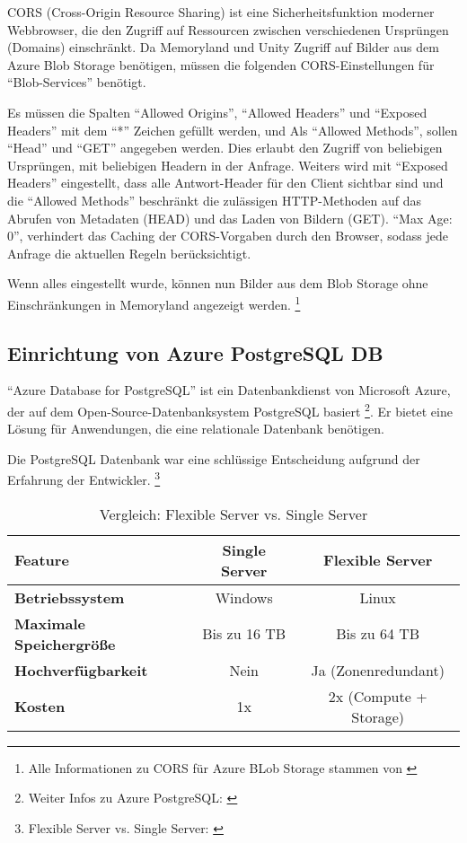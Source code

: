 CORS (Cross-Origin Resource Sharing) ist eine Sicherheitsfunktion moderner Webbrowser, 
die den Zugriff auf Ressourcen zwischen verschiedenen Ursprüngen (Domains) einschränkt.
Da Memoryland und Unity Zugriff auf Bilder aus dem Azure Blob Storage benötigen, müssen
die folgenden CORS-Einstellungen für ``Blob-Services'' benötigt.

Es müssen die Spalten ``Allowed Origins'', ``Allowed Headers'' und ``Exposed Headers''
mit dem ``*'' Zeichen gefüllt werden, und Als ``Allowed Methods'', sollen ``Head'' und
``GET'' angegeben werden. Dies erlaubt den Zugriff von beliebigen Ursprüngen, mit beliebigen
Headern in der Anfrage. Weiters wird mit ``Exposed Headers'' eingestellt, dass alle 
Antwort-Header für den Client sichtbar sind und die ``Allowed Methods'' beschränkt die 
zulässigen HTTP-Methoden auf das Abrufen von Metadaten (HEAD) und das 
Laden von Bildern (GET). ``Max Age: 0'', verhindert das Caching der CORS-Vorgaben 
durch den Browser, sodass jede Anfrage die aktuellen Regeln berücksichtigt.

Wenn alles eingestellt wurde, können nun Bilder aus dem Blob Storage ohne Einschränkungen 
in Memoryland angezeigt werden. \footnote{Alle Informationen zu CORS für Azure BLob Storage stammen von \cite{MicrosoftCorporationc}}


\subsection{Einrichtung von Azure PostgreSQL DB}

``Azure Database for PostgreSQL'' ist ein Datenbankdienst von Microsoft Azure, 
der auf dem Open-Source-Datenbanksystem PostgreSQL basiert \footnote{Weiter Infos zu Azure PostgreSQL: \cite{MicrosoftCorporationf}}. 
Er bietet eine Lösung für Anwendungen, die eine relationale Datenbank benötigen.

Die PostgreSQL Datenbank war eine schlüssige Entscheidung aufgrund der Erfahrung der Entwickler.
\footnote{Flexible Server vs. Single Server: \cite{MicrosoftCorporatione}}

\begin{table}[h t]
    \centering
    \caption{Vergleich: Flexible Server vs. Single Server}
    \label{tab:azure-postgresql}
    \begin{tabular}{lcc}
    \hline
    \textbf{Feature}                & \textbf{Single Server} & \textbf{Flexible Server} \\ \hline
    \textbf{Betriebssystem}         & Windows                & Linux                    \\
    \textbf{Maximale Speichergrö\ss{}e} & Bis zu 16 TB           & Bis zu 64 TB             \\
    \textbf{Hochverfügbarkeit}      & Nein                   & Ja (Zonenredundant)      \\
    \textbf{Kosten}                 & 1x                     & 2x (Compute + Storage)   \\ \hline
    \end{tabular}
\end{table}

